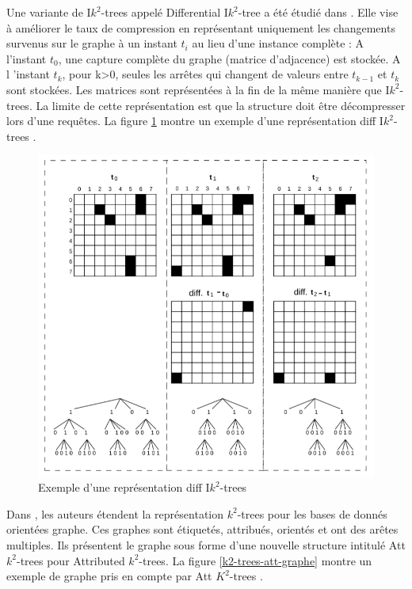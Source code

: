 Une variante de I$k^2$-trees appelé Differential I$k^2$-tree a été étudié dans \citep{alvarez2017succinct}. Elle vise à améliorer le taux de compression en représentant uniquement les changements survenus sur le graphe à un instant $t_i$ au lieu d'une instance complète : A l'instant $t_0$, une capture complète du graphe (matrice d'adjacence) est stockée. A l 'instant $t_k$, pour k>0, seules les arrêtes qui changent de valeurs entre $t_{k-1}$ et $t_k$ sont stockées. Les matrices sont représentées à la fin de la même manière que I$k^2$-trees. La limite de cette représentation est que la structure doit être décompresser lors d'une requêtes.
La figure \ref{Ik2-trees-diff} montre un exemple d'une représentation diff I$k^2$-trees \citep{alvarez2017succinct}.

\begin{figure}[H]
\begin{center}
\includegraphics[height=200 pt, width=380 pt]{./ressources/image/Ik2-trees-diff.png} 
\end{center}
\caption{Exemple d'une représentation diff I$k^2$-trees}
\label{Ik2-trees-diff}
\end{figure}

Dans \citep{alvarez2018compact}, les auteurs étendent la représentation $k^2$-trees pour les bases de donnés orientées graphe. Ces graphes sont étiquetés, attribués, orientés et ont des arêtes multiples. Ils présentent le graphe sous forme d'une nouvelle structure intitulé Att $k^2$-trees pour Attributed $k^2$-trees.
La figure \ref{k2-trees-att-graphe} montre un exemple de graphe pris en compte par Att $K^2$-trees \citep{alvarez2018compact}.


